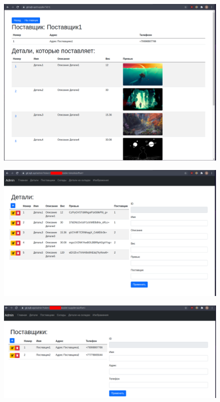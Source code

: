 \documentclass[20pt,a4paper]{report}
\begin{document}
		\begin{figure}[H]
			\includegraphics[width=\textwidth]{4.png}
		\end{figure}
		\begin{figure}[H]
			\includegraphics[width=\textwidth]{5.png}
		\end{figure}
		\begin{figure}[H]
			\includegraphics[width=\textwidth]{6.png}
		\end{figure}
\end{document}
